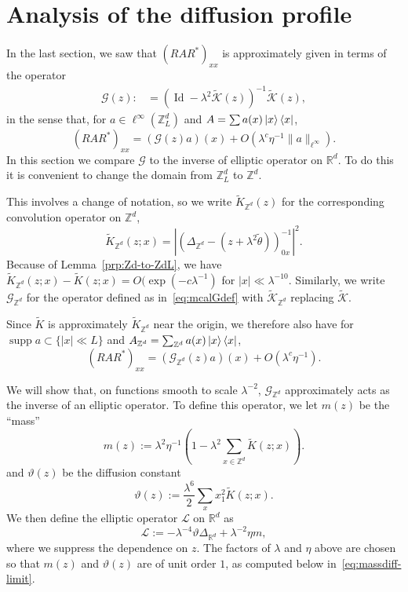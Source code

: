 \documentclass[11pt]{amsart}
\def\Real{{\mathbb R}}
\def\bbZ{{\mathbb Z}}
\newcommand{\Id}{{\operatorname*{Id}}}
\newcommand{\supp}{\operatorname*{supp}}
\def\bra#1{\mathinner{\langle{#1}|}}
\def\ket#1{\mathinner{|{#1}\rangle}}
\newcommand{\mcal}[1]{{\mathcal{#1}}}
\numberwithin{equation}{section}
\numberwithin{theorem}{section}
\begin{document}
\section{Analysis of the diffusion profile}
\label{sec:RAR}
In the last section, we saw that $ (RAR^*)_{xx}$ is approximately given in terms of the operator
\begin{align}
\label{eq:mcalGdef}
	\mathcal{G}(z):&=(\Id-\lambda^{2}\tilde{\mathcal{K}}(z))^{-1}\tilde{\mathcal{K}}(z),
\end{align}
in the sense that, for $a\in \ell^\infty(\bbZ^d_L)$ and $A = \sum a(x)\ket{x}\bra{x}$,
\[
(RAR^*)_{xx} = (\mcal{G}(z) a)(x) + O(\lambda^c \eta^{-1} \|a\|_{\ell^\infty}).
\]
In this section we compare $\mcal{G}$
to the inverse of elliptic operator on $\Real^d$.  To do this it is convenient to change the domain from $\bbZ^d_L$ to $\bbZ^d$.

This involves a change of notation, so we write $\tilde{K}_{\bbZ^d}(z)$ for the corresponding convolution operator on $\bbZ^d$,
\[
\tilde{K}_{\bbZ^d}(z;x) = |(\Delta_{\bbZ^d} - (z+\lambda^2\tilde{\theta}))^{-1}_{0x}|^2.
\]
Because of Lemma~\ref{prp:Zd-to-ZdL}, we have
$\tilde{K}_{\bbZ^d}(z;x) - \tilde{K}(z;x) = O(\exp(-c\lambda^{-1})$ for $|x|\ll \lambda^{-10}$.  Similarly, we write $\mcal{G}_{\bbZ^d}$ for the operator defined as in~\eqref{eq:mcalGdef} with $\tilde{\mcal{K}}_{\bbZ^d}$ replacing $\tilde{\mcal{K}}$.

Since $\tilde{K}$ is approximately $\tilde{K}_{\bbZ^d}$ near the origin, we therefore also have for $\supp a \subset \{|x|\ll L\}$ and $A_{\bbZ^d} = \sum_{\bbZ^d} a(x)\ket{x}\bra{x}$,
\[
(RAR^*)_{xx} =
(\mcal{G}_{\bbZ^d}(z) a)(x) + O(\lambda^c\eta^{-1}).
\]


We will show that, on functions smooth to scale $\lambda^{-2}$, $\mcal{G}_{\bbZ^d}$ approximately acts as the inverse of an elliptic operator.
To define this operator, we let $m(z)$ be the ``mass''
\begin{equation}
\label{eq:massdef}
m(z) := \lambda^2\eta^{-1} (1 - \lambda^2 \sum_{x\in \bbZ^{d}} \tilde{K}(z;x)).
\end{equation}
and $\vartheta(z)$ be the diffusion constant
\begin{equation}
\label{eq:diffdef}
\vartheta(z) := \frac{\lambda^6}{2}  \sum_x x_1^2 \tilde{K}(z;x).
\end{equation}
We then define the elliptic operator $\mcal{L}$ on $\Real^d$ as
\begin{equation}
\label{eq:L-def}
\mcal{L} := -\lambda^{-4}\vartheta  \Delta_{\Real^d} +  \lambda^{-2}\eta m,
\end{equation}
where we suppress the dependence on $z$.   The factors of $\lambda$ and $\eta$ above are chosen so that $m(z)$ and $\vartheta(z)$ are of unit order $1$, as computed below in~\eqref{eq:massdiff-limit}.
\end{document}
